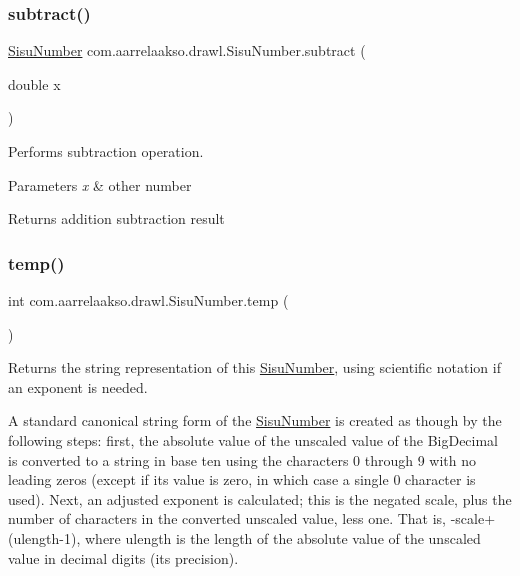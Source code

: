\subsubsection{\texorpdfstring{subtract()}{subtract()}\hspace{0.1cm}{\footnotesize\ttfamily [3/3]}}
{\footnotesize\ttfamily \hyperlink{classcom_1_1aarrelaakso_1_1drawl_1_1_sisu_number}{Sisu\+Number} com.\+aarrelaakso.\+drawl.\+Sisu\+Number.\+subtract (\begin{DoxyParamCaption}\item[{double}]{x }\end{DoxyParamCaption})\hspace{0.3cm}{\ttfamily [protected]}}



Performs subtraction operation. 


\begin{DoxyParams}{Parameters}
{\em x} & other number \\
\hline
\end{DoxyParams}
\begin{DoxyReturn}{Returns}
addition subtraction result 
\end{DoxyReturn}
\mbox{\label{classcom_1_1aarrelaakso_1_1drawl_1_1_sisu_number_a846e0834c619e63a8d85579484ab4276}} 
\subsubsection{\texorpdfstring{temp()}{temp()}}
{\footnotesize\ttfamily int com.\+aarrelaakso.\+drawl.\+Sisu\+Number.\+temp (\begin{DoxyParamCaption}{ }\end{DoxyParamCaption})\hspace{0.3cm}{\ttfamily [private]}}



Returns the string representation of this \hyperlink{classcom_1_1aarrelaakso_1_1drawl_1_1_sisu_number}{Sisu\+Number}, using scientific notation if an exponent is needed. 

A standard canonical string form of the \hyperlink{classcom_1_1aarrelaakso_1_1drawl_1_1_sisu_number}{Sisu\+Number} is created as though by the following steps\+: first, the absolute value of the unscaled value of the Big\+Decimal is converted to a string in base ten using the characters \textquotesingle{}0\textquotesingle{} through \textquotesingle{}9\textquotesingle{} with no leading zeros (except if its value is zero, in which case a single \textquotesingle{}0\textquotesingle{} character is used). Next, an adjusted exponent is calculated; this is the negated scale, plus the number of characters in the converted unscaled value, less one. That is, -\/scale+(ulength-\/1), where ulength is the length of the absolute value of the unscaled value in decimal digits (its precision). 

